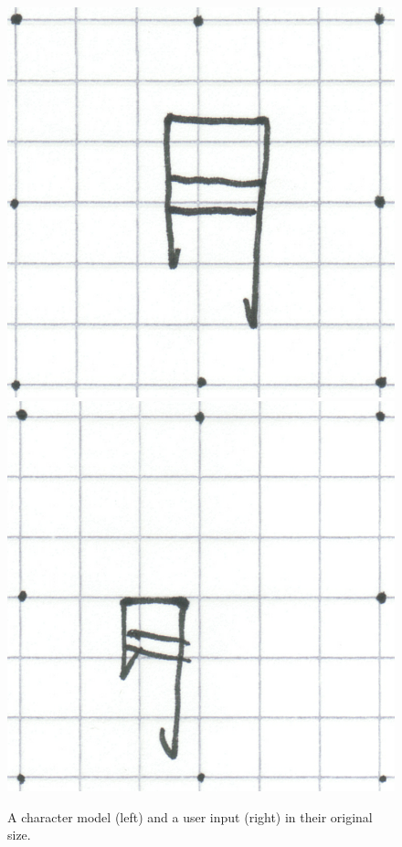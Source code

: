 \begin{figure}[htbp]
  \begin{center}
    \includegraphics[scale=0.2]{images/characterModel.png}
    \includegraphics[scale=0.2]{images/input1.png}
    \caption{A character model (left) and a user input (right) in their original size.}
    \label{fig:inputandcharactermodel}
  \end{center}
\end{figure}
